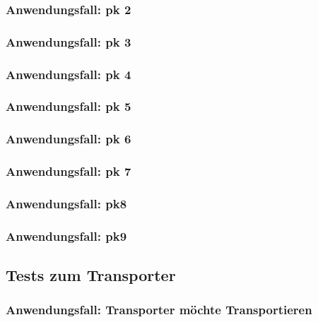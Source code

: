 \documentclass[enabledeprecatedfontcommands,fontsize=12pt,paper=a4,twoside]{scrartcl}
\begin{document}

\subsubsection{Anwendungsfall: pk 2}


\subsubsection{Anwendungsfall: pk 3}


\subsubsection{Anwendungsfall: pk 4}


\subsubsection{Anwendungsfall: pk 5}


\subsubsection{Anwendungsfall: pk 6}


\subsubsection{Anwendungsfall: pk 7}


\subsubsection{Anwendungsfall: pk8 }


\subsubsection{Anwendungsfall: pk9}


\subsection{Tests zum Transporter}

\subsubsection{Anwendungsfall: Transporter möchte Transportieren}
\end{document}
